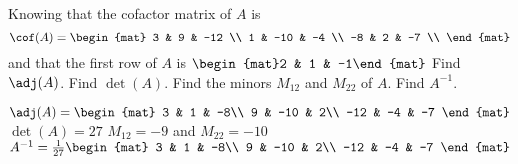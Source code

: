 
\begin{Exercise}[
name={},
title={}, 
difficulty=0,
origin={\cite{MB}}]
Knowing that the cofactor matrix of $A$ is
\[
\cof(A)=
\begin{mat}
  3 & 9 & -12 \\
  1 & -10 & -4 \\
  -8 & 2 & -7 \\
\end{mat}
\] and that the first row of $A$ is $\begin{mat}2 & 1 & -1\end{mat}$
\Question Find $\adj(A)$.
\Question Find $\det(A)$.
\Question Find the minors $M_{12}$ and $M_{22}$ of $A$.
\Question Find $A^{-1}$.
\end{Exercise}

\begin{Answer}
\Question $\adj(A) =
\begin{mat}
3 & 1 & -8\\
9 & -10 & 2\\
-12 & -4 & -7
\end{mat}$
\Question $\det(A) = 27$
\Question $M_{12}=-9$ and $M_{22}=-10$
\Question $A^{-1}=\frac{1}{27}
\begin{mat}
3 & 1 & -8\\
9 & -10 & 2\\
-12 & -4 & -7
\end{mat}$
\end{Answer}

